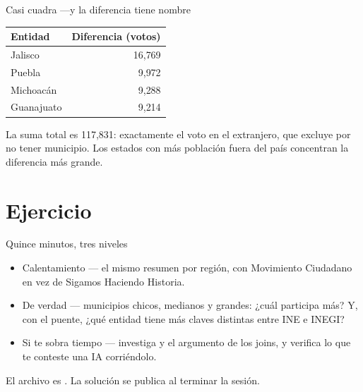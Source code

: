 \begin{frame}{Casi cuadra —y la diferencia tiene nombre}
  \vspace{0.3em}
  \begin{center}
  \begin{tabular}{lr}
    \toprule
    Entidad & Diferencia (votos) \\
    \midrule
    Jalisco    & 16{,}769 \\
    Puebla     & 9{,}972 \\
    Michoacán  & 9{,}288 \\
    Guanajuato & 9{,}214 \\
    \bottomrule
  \end{tabular}
  \end{center}

  \vspace{0.9em}
  La suma total es 117{,}831: exactamente el voto en el extranjero, que
   excluye por no tener municipio.
  Los estados con más población fuera del país concentran la diferencia
  más grande.
\end{frame}

\section{Ejercicio}

\begin{frame}{Quince minutos, tres niveles}
  \vspace{0.4em}
  \begin{itemize}\setlength{\itemsep}{1.0em}
    \item \ac{Calentamiento} — el mismo resumen por región, con Movimiento
          Ciudadano en vez de Sigamos Haciendo Historia.
    \item \ac{De verdad} — municipios chicos, medianos y grandes: ¿cuál
          participa más? Y, con el puente, ¿qué entidad tiene más claves
          distintas entre INE e INEGI?
    \item \ac{Si te sobra tiempo} — investiga  y el
          argumento  de los joins, y verifica lo que te
          conteste una IA corriéndolo.
  \end{itemize}

  \vspace{1.1em}
  {\small\color{grisTenue}El archivo es . La solución
  se publica al terminar la sesión.}
\end{frame}

